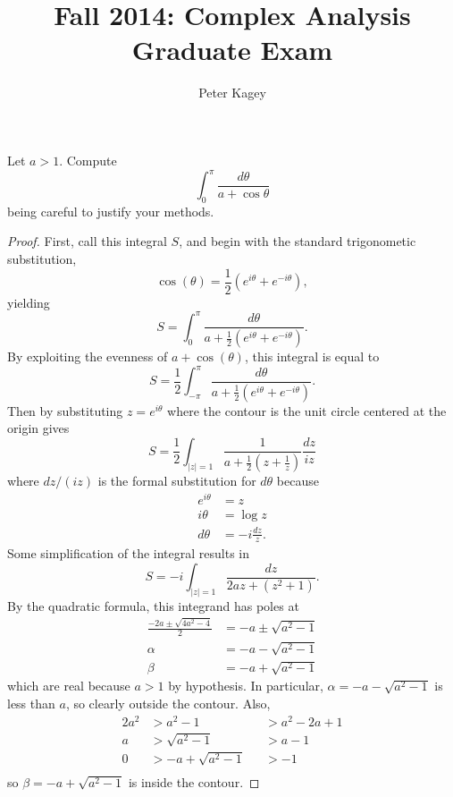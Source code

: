 \documentclass{article}
\newenvironment{problem}[2][Problem]{\begin{trivlist}
\item[\hskip \labelsep {\bfseries #1}\hskip \labelsep {\bfseries #2.}]}{\end{trivlist}}
\begin{document}
\title{Fall 2014: Complex Analysis Graduate Exam}
\author{Peter Kagey}

\maketitle

\begin{problem}{1}
  Let $a > 1$. Compute \[
    \int_0^\pi \frac{d\theta}{a + \cos\theta}
  \] being careful to justify your methods.
\end{problem}

\begin{proof}
  First, call this integral $S$, and begin with the standard trigonometic substitution, \[
    \cos(\theta) = \frac{1}{2}(e^{i\theta} + e^{-i\theta}),
  \] yielding \[
    S = \int_0^\pi \frac{d\theta}{a + \frac{1}{2}(e^{i\theta} + e^{-i\theta})}.
  \]
  By exploiting the evenness of $a + \cos(\theta)$, this integral is equal to \[
    S = \frac{1}{2}\int_{-\pi}^\pi \frac{d\theta}{a + \frac{1}{2}(e^{i\theta} + e^{-i\theta})}.
  \]
  Then by substituting $z = e^{i\theta}$ where the contour is the unit circle
  centered at the origin gives \[
    S = \frac{1}{2}\int_{|z| = 1} \frac{1}{a + \frac{1}{2}\left(z + \frac{1}{z}\right)}\frac{dz}{iz}
  \] where $dz/(iz)$ is the formal substitution for $d\theta$ because \begin{align*}
    e^{i\theta} &= z \\
    i\theta &= \log z \\
    d\theta &= -i\frac{dz}{z}.
  \end{align*}
  Some simplification of the integral results in \[
    S = -i\int_{|z| = 1} \frac{dz}{2az + \left(z^2 + 1\right)}.
  \]
  By the quadratic formula, this integrand has poles at \begin{align*}
    \frac{-2a \pm \sqrt{4a^2-4}}{2} &= -a \pm \sqrt{a^2 - 1} \\
    \alpha &= -a - \sqrt{a^2 - 1}\\
    \beta &= -a + \sqrt{a^2 - 1}
  \end{align*} which are real because $a > 1$ by hypothesis. In particular,
  $\alpha = -a - \sqrt{a^2 - 1}$ is less than $a$, so clearly outside the contour.
  Also, \begin{alignat*}{2}
    a^2 &> a^2 - 1      &&> a^2 - 2a + 1 \\
    a &> \sqrt{a^2 - 1} &&> a - 1 \\
    0 &> -a + \sqrt{a^2 - 1} &&> -1 \\
  \end{alignat*} so $\beta = -a + \sqrt{a^2 - 1}$ is inside the contour.


\end{proof}
\end{document}
